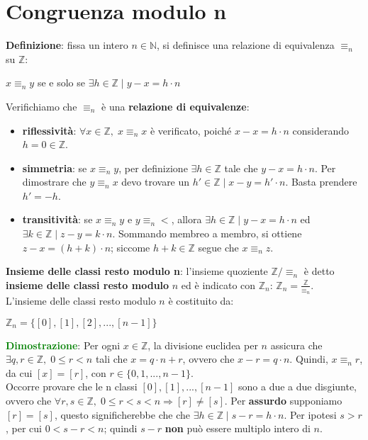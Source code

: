 \section{Congruenza modulo n}
\textbf{Definizione}: fissa un intero $n \in \mathbb{N}$, si definisce una relazione di equivalenza $\equiv_n$ su $\mathbb{Z}$:
\begin{center}
    $x \equiv_n y$ se e solo se $\exists h \in \mathbb{Z} \; | \; y - x = h \cdot n$
\end{center}
Verifichiamo che $\equiv_n$ è una \textbf{relazione di equivalenze}:
\begin{itemize}[nosep]
    \item \textbf{riflessività}: $\forall x \in \mathbb{Z}, \; x \equiv_n x$ è verificato, poiché $x - x = h \cdot n$ considerando $h = 0 \in \mathbb{Z}$.
    \item \textbf{simmetria}: se $x \equiv_n y$, per definizione $\exists h \in \mathbb{Z}$ tale che $y - x = h \cdot n$. Per dimostrare che $y \equiv_n x$ devo trovare un $h' \in \mathbb{Z} \; | \; x-y = h' \cdot n$. Basta prendere $h'=-h$.
    \item \textbf{transitività}: se $x \equiv_n y$ e $y \equiv_n <$, allora $\exists h \in \mathbb{Z} \; | \; y - x = h \cdot n$ ed $\exists k \in \mathbb{Z} \; | \; z - y = k \cdot n$. Sommando membreo a membro, si ottiene $z - x = (h + k) \cdot n$; siccome $h + k \in \mathbb{Z}$ segue che $x \equiv_n z$.
\end{itemize}
\textbf{Insieme delle classi resto modulo n}: l'insieme quoziente $\mathbb{Z}/ \equiv_n$ è detto \textbf{insieme delle classi resto modulo} $n$ ed è indicato con $\mathbb{Z}_n$: $\mathbb{Z}_n = \frac{\mathbb{Z}}{\equiv_n}$. \\
L'insieme delle classi resto modulo $n$ è costituito da: 
\begin{center}
    $\mathbb{Z}_n = \{[0], [1], [2], ..., [n-1]\}$
\end{center}
\textcolor{green}{\textbf{Dimostrazione}}: Per ogni $x \in \mathbb{Z}$, la divisione euclidea per $n$ assicura che $\exists q,r \in \mathbb{Z}, \; 0 \leq r < n$ tali che $x = q \cdot n + r$, ovvero che $x - r = q \cdot n$. Quindi, $x \equiv_n r$, da cui $[x] = [r]$, con $r \in \{0,1,..., n-1\}$. \\
Occorre provare che le n classi $[0], [1], ..., [n-1]$ sono a due a due disgiunte, ovvero che $\forall r,s \in \mathbb{Z}, \; 0 \leq r < s < n \Rightarrow [r] \neq [s]$. Per \textbf{assurdo} supponiamo $[r] = [s]$, questo significherebbe che che $\exists h \in \mathbb{Z} \; | \; s - r = h \cdot n$. Per ipotesi $s > r$, per cui $0 < s - r < n$; quindi $s - r$ \textbf{non} può essere multiplo intero di $n$. \\
